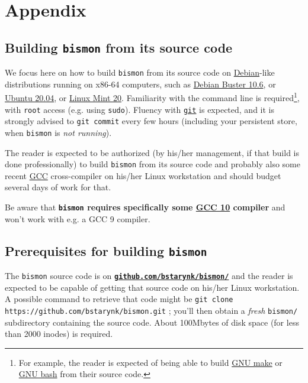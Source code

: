 \section*{Appendix}
\label{sec:appendix}

\subsection{Building \texttt{bismon} from its source code}
\label{subsec:building-bismon}

We focus here on how to build \texttt{bismon} from its source code on
\href{http://debian.org/}{Debian}-like distributions running on x86-64
computers, such as
\href{https://www.debian.org/releases/stable/}{Debian Buster 10.6}, or
\href{https://ubuntu.com/}{Ubuntu 20.04}, or
\href{https://linuxmint.com/}{Linux Mint 20}. Familiarity with the
command line is required\footnote{For example, the reader is expected
  of being able to build \href{https://www.gnu.org/software/make/}{GNU
    make} or \href{https://www.gnu.org/software/bash/}{GNU bash} from
  their source code.}, with \texttt{root} access (e.g. using
\texttt{sudo}). Fluency with \href{https://git-scm.com/}{\texttt{git}}
is expected, and it is strongly advised to \texttt{git commit} every
few hours (including your persistent store, when \texttt{bismon} is
\emph{not running}).

The reader is expected to be authorized (by his/her management, if
that build is done professionally) to build \texttt{bismon} from its
source code and probably also some recent
\href{https://gcc.gnu.org/}{GCC} cross-compiler on his/her Linux workstation
and should budget several days of work for that.


{\large Be aware that \textbf{\texttt{bismon} requires specifically some
  \href{https://gcc.gnu.org/gcc-10/}{GCC 10} compiler} and won't work
  with e.g. a GCC 9 compiler.}

\subsection{Prerequisites for building \texttt{bismon}}
\label{subsec:prereq-bismon}

The \texttt{bismon} source code is on
\href{https://github.com/bstarynk/bismon/}{\texttt{\textbf{github.com/bstarynk/bismon/}}}
and the reader is expected to be capable of getting that source code
on his/her Linux workstation. A possible command to retrieve that code
might be \texttt{git clone https://github.com/bstarynk/bismon.git} ;
you'll then obtain a \emph{fresh} \texttt{bismon/} subdirectory
containing the source code. About 100Mbytes of disk space (for less
than 2000 inodes) is required.

